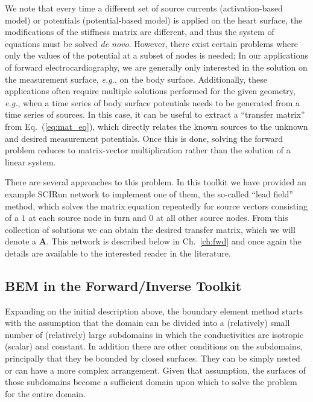 \documentclass[fleqn,11pt,openany]{book}
\begin{document}
We note that every time a different set of source currents
(activation-based model) or potentials (potential-based model) is applied
on the heart surface, the modifications of the stiffness matrix are
different, and thus the system of equations must be solved \textit{de
novo}.
However, there exist certain problems where only the values of the potential at
a subset of nodes is needed; In our applications of forward electrocardiography,
we are generally only interested in the solution on the measurement
surface, \textit{e.g.}, on the body surface. Additionally, these applications often
require multiple solutions performed for the given geometry, \textit{e.g.},
when a time series of body surface potentials needs to be generated
from a time series of sources.
In this case, it can be useful to extract a ``transfer matrix''
from Eq.~(\ref{eq:mat_eq}), which directly relates the known sources to the
unknown and desired measurement potentials. Once this is done, solving the
forward problem reduces to matrix-vector multiplication rather than the
solution of a linear system.

There are several approaches to this problem. In this toolkit we have
provided an example SCIRun network to implement one of them, the so-called
``lead field'' method, which solves the matrix equation repeatedly for
source vectors consisting of a $1$ at each source node in turn and $0$ at
all other source nodes. From this collection of solutions we can obtain the
desired transfer matrix, which we will denote a $\mathbf{A}$. This network is described below in
Ch.~\ref{ch:fwd} and once again the details are available to the interested
reader in the literature.

\subsection{BEM in the Forward/Inverse Toolkit}

Expanding on the initial description above, the boundary element method starts with the assumption
that the domain can be divided into a (relatively) small number of
(relatively) large subdomains in which the conductivities are isotropic
(scalar) and constant. In addition there are other conditions on the
subdomains, principally that they be bounded by closed surfaces.
They can be simply nested or can have a more complex arrangement. Given
that assumption, the surfaces of those subdomains become a sufficient
domain upon which to solve the problem for the entire domain.
\end{document}
